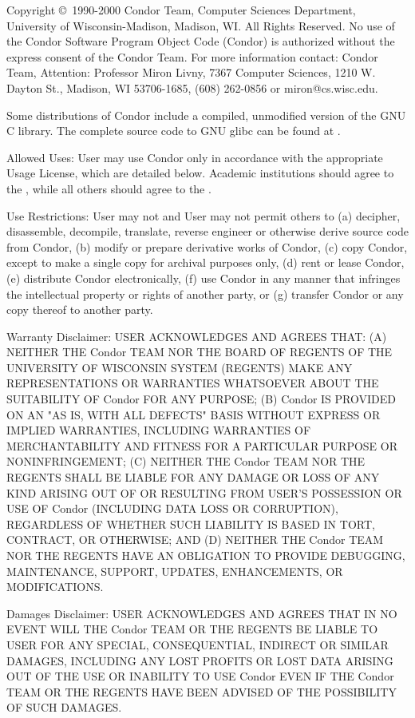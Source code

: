 Copyright \copyright\ 1990-2000 Condor Team, Computer Sciences
Department, University of Wisconsin-Madison, Madison, WI. All Rights
Reserved. No use of the Condor Software Program Object Code (Condor)
is authorized without the express consent of the Condor Team. For more
information contact: Condor Team, Attention: Professor Miron Livny,
7367 Computer Sciences, 1210 W. Dayton St., Madison, WI 53706-1685,
(608) 262-0856 or miron@cs.wisc.edu. 

Some distributions of Condor include a compiled, unmodified version of 
the GNU C library.  The complete source code to GNU glibc can be 
found at .

Allowed Uses: User may use Condor only in accordance with the
appropriate Usage License, which are detailed below.  Academic
institutions should agree to the , while all others should agree to the .

Use Restrictions: User may not and User may not permit others to (a)
decipher, disassemble, decompile, translate, reverse engineer or
otherwise derive source code from Condor, (b) modify or prepare
derivative works of Condor, (c) copy Condor, except to make a single
copy for archival purposes only, (d) rent or lease Condor, (e)
distribute Condor electronically, (f) use Condor in any manner that
infringes the intellectual property or rights of another party, or (g)
transfer Condor or any copy thereof to another party. 

Warranty Disclaimer: USER ACKNOWLEDGES AND AGREES THAT: (A) NEITHER
THE Condor TEAM NOR THE BOARD OF REGENTS OF THE UNIVERSITY OF
WISCONSIN SYSTEM (REGENTS) MAKE ANY REPRESENTATIONS OR WARRANTIES
WHATSOEVER ABOUT THE SUITABILITY OF Condor FOR ANY PURPOSE; (B) Condor
IS PROVIDED ON AN "AS IS, WITH ALL DEFECTS" BASIS WITHOUT EXPRESS OR
IMPLIED WARRANTIES, INCLUDING WARRANTIES OF MERCHANTABILITY AND
FITNESS FOR A PARTICULAR PURPOSE OR NONINFRINGEMENT; (C) NEITHER THE
Condor TEAM NOR THE REGENTS SHALL BE LIABLE FOR ANY DAMAGE OR LOSS OF
ANY KIND ARISING OUT OF OR RESULTING FROM USER'S POSSESSION OR USE
OF Condor (INCLUDING DATA LOSS OR CORRUPTION), REGARDLESS OF WHETHER
SUCH LIABILITY IS BASED IN TORT, CONTRACT, OR OTHERWISE; AND (D)
NEITHER THE Condor TEAM NOR THE REGENTS HAVE AN OBLIGATION TO PROVIDE
DEBUGGING, MAINTENANCE, SUPPORT, UPDATES, ENHANCEMENTS, OR
MODIFICATIONS. 

Damages Disclaimer: USER ACKNOWLEDGES AND AGREES THAT IN NO EVENT WILL
THE Condor TEAM OR THE REGENTS BE LIABLE TO USER FOR ANY SPECIAL,
CONSEQUENTIAL, INDIRECT OR SIMILAR DAMAGES, INCLUDING ANY LOST PROFITS
OR LOST DATA ARISING OUT OF THE USE OR INABILITY TO USE Condor EVEN IF
THE Condor TEAM OR THE REGENTS HAVE BEEN ADVISED OF THE POSSIBILITY OF
SUCH DAMAGES. 

